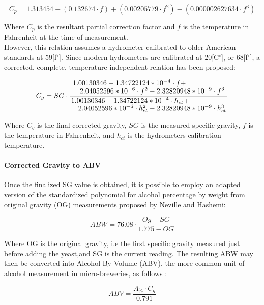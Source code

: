 \documentclass[twoside]{ctuthesis}
\theoremstyle{plain}
\theoremstyle{definition}
\theoremstyle{note}
\begin{document}
\begin{equation}
C_p = 1.313454 - (0.132674\cdot f) + (0.00205779 \cdot f^2) - (0.000002627634 \cdot f^3)
\end{equation}

Where $C_p$ is the resultant partial correction factor and $f$ is the temperature in Fahrenheit at the time of measurement.\\
However, this relation assumes a hydrometer calibrated to older American standards at 59[f$^\circ$]. Since modern hydrometers are calibrated at 20[C$^\circ$], or 68[f$^\circ$], a corrected, complete, temperature independent relation has been proposed:

\begin{equation}
C_g = SG \cdot \frac{\splitfrac{1.00130346 - 1.34722124*10^{-4} \cdot f + }{2.04052596*10^{-6} \cdot f^2 - 2.32820948*10^{-9} \cdot f^3} }{\splitfrac{1.00130346 - 1.34722124*10^{-4} \cdot h_{ct} +}{ 2.04052596*10^{-6} \cdot h_{ct}^2 - 2.32820948*10^{-9} \cdot h_{ct}^3}}
\end{equation}

Where $C_g$ is the final corrected gravity, $SG$ is the measured specific gravity, $f$ is the temperature in Fahrenheit, and $h_{ct}$ is the hydrometers calibration temperature.\\

\paragraph{Corrected Gravity to ABV}

Once the finalized SG value is obtained, it is possible to employ an adapted version of the standardized polynomial for alcohol percentage by weight from original gravity (OG) measurements proposed by Neville and Hashemi\cite{PH_In_yeast}:

\begin{equation}
ABW = 76.08 \cdot \frac{Og - SG}{1.775-OG}
\end{equation} 

Where OG is the original gravity, i.e the first specific gravity measured just before adding the yeast,and SG is the current reading.
The resulting ABW may then be converted into Alcohol By Volume (ABV), the more common unit of alcohol measurement in micro-breweries, as follows \cite{Brewing_Science}:

\begin{equation}
	ABV = \frac{A_{\%} \cdot C_g}{0.791}
\end{equation}
\end{document}
